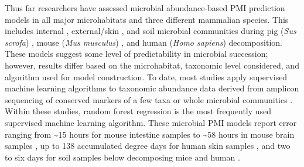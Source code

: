 \documentclass[
  10pt,
  letterpaper,
]{article}
\begin{document}
Thus far researchers have assessed microbial abundance-based PMI
prediction models in all major microhabitats and three different
mammalian species. This includes internal
\citep{liu_predicting_2020, hu_predicting_2021}, external/skin
\citep{pechal_potential_2014, johnson_machine_2016, metcalf_microbial_2016, belk_microbiome_2018, burcham_conserved_2024},
and soil \citep{belk_microbiome_2018, burcham_conserved_2024} microbial
communities during pig (\emph{Sus scrofa})
\citep{pechal_potential_2014}, mouse (\emph{Mus musculus})
\citep{metcalf_microbial_2016, liu_predicting_2020, belk_microbiome_2018},
and human (\emph{Homo sapiens})
\citep{johnson_machine_2016, metcalf_microbial_2016, hu_predicting_2021, belk_microbiome_2018, burcham_conserved_2024}
decomposition. These models suggest some level of predictability in
microbial succession; however, results differ based on the microhabitat,
taxonomic level considered, and algorithm used for model construction.
To date, most studies apply supervised machine learning algorithms to
taxonomic abundance data derived from amplicon sequencing of conserved
markers of a few taxa \citep{pechal_potential_2014} or whole microbial
communities
\citep{johnson_machine_2016, metcalf_microbial_2016, liu_predicting_2020, hu_predicting_2021, belk_microbiome_2018, burcham_conserved_2024}.
Within these studies, random forest regression is the most frequently
used supervised machine learning algorithm. These microbial PMI models
report error ranging from \textasciitilde15 hours for mouse intestine
samples to \textasciitilde58 hours in mouse brain samples
\citep{liu_predicting_2020}, up to 138 accumulated degree days for human
skin samples \citep{johnson_machine_2016}, and two to six days for soil
samples below decomposing mice and human \citep{belk_microbiome_2018}.
\end{document}
